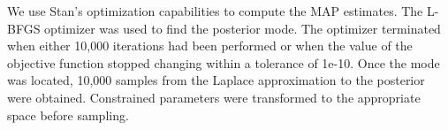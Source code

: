 We use Stan’s optimization capabilities to compute the MAP estimates.  The L-BFGS optimizer was used to find the posterior mode.  The optimizer terminated when either 10,000 iterations had been performed or when the value of the objective function stopped changing within a tolerance of 1e-10. Once the mode was located, 10,000 samples from the Laplace approximation to the posterior were obtained. Constrained parameters were transformed to the appropriate space before sampling.

%
%
%

